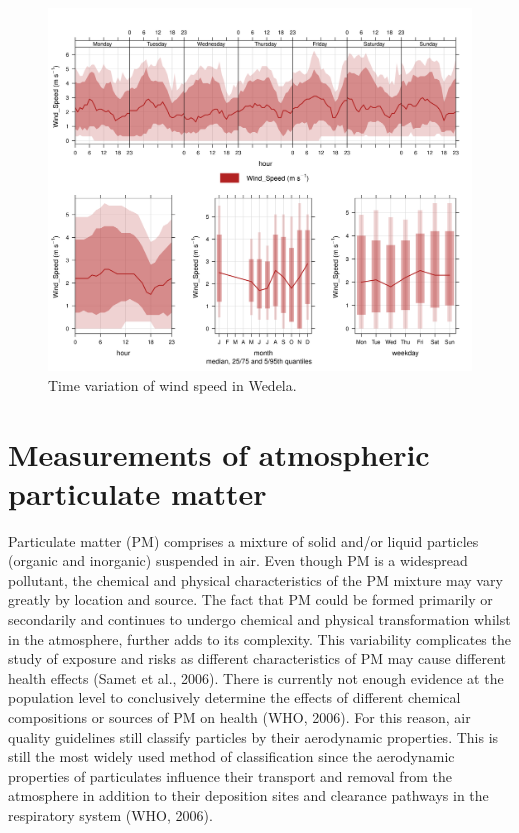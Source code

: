 \documentclass{nwureport}
\begin{document}
\begin{figure}[!htb]
    \centering
    \includegraphics[width=\textwidth]{images/Wedela_Wind_Speed_timevary.png}
    \caption{Time variation of wind speed in Wedela.}
    \label{fig:summary}
\end{figure}

\section{Measurements of atmospheric particulate matter}

Particulate matter (PM) comprises a mixture of solid and/or liquid particles (organic and inorganic) suspended in air. Even though PM is a widespread pollutant, the chemical and physical characteristics of the PM mixture may vary greatly by location and source. The fact that PM could be formed primarily or secondarily and continues to undergo chemical and physical transformation whilst in the atmosphere, further adds to its complexity. This variability complicates the study of exposure and risks as different characteristics of PM may cause different health effects (Samet et al., 2006). There is currently not enough evidence at the population level to conclusively determine the effects of different chemical compositions or sources of PM on health (WHO, 2006). For this reason, air quality guidelines still classify particles by their aerodynamic properties. This is still the most widely used method of classification since the aerodynamic properties of particulates influence their transport and removal from the atmosphere in addition to their deposition sites and clearance pathways in the respiratory system (WHO, 2006).
\end{document}
